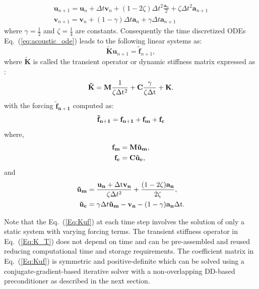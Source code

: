 \documentclass{article}
\begin{document}
\begin{align}
\mathbf{u}_{n+1} = \mathbf{u}_n + \Delta t \mathbf{v}_n + (1-2\zeta)  \Delta t^2 \frac{\mathbf{a}_n}{2} + \zeta \Delta t^2 \mathbf{a}_{n+1} \\
\mathbf{v}_{n+1} = \mathbf{v}_n + (1-\gamma)  \Delta t \mathbf{a}_n + \gamma \Delta t \mathbf{a}_{n+1}
\end{align}
where $\gamma = \frac{1}{2}$ and $\zeta = \frac{1}{4}$ are constants. Consequently the time discretized ODEs Eq.~(\ref{eq:acoustic_ode}) leads to the following linear systems as:
\begin{equation}\label{Eq:Kuf}
\mathbf{\tilde{K}} \mathbf{u}_{n+1} = \mathbf{\tilde{f}}_{n+1},
\end{equation} 
where $\mathbf{\tilde{K}}$ is called the transient operator or dynamic stiffness matrix expressed as \cite{farhat_nasa}:
\begin{equation}\label{Eq:K_T}
\mathbf{\tilde{K}} = \bf{M} \frac{\mathrm{1}}{\zeta \mathrm{\Delta t^2}} + \bf{C} \frac{\gamma}{\zeta \mathrm{\Delta t} } + \bf{K}.
\end{equation}
with the forcing $\mathbf{\tilde{f}_{n+1}}$ computed as:
\begin{equation}
\mathbf{\tilde{f}_{n+1}} = \bf{f}_{n+1} + \bf{f_m} + \bf{f_c}
\end{equation}
where,
\begin{align}\label{Eq:fparts}
    \bf{f_m} &= \bf{M}  \bf{\tilde{u}_m},  \\ \label{Eq:fparts2}
    \bf{f_c} &= \bf{C}   \bf{\tilde{u}_c}, 
\end{align}
and
\begin{align}\label{Eq:UmCm}
    \bf{\tilde{u}_m} &=  \frac{\bf{u_n} + \mathrm{\Delta t}  \bf{v_n} } {\zeta \Delta t^2}+\frac{(1-2\zeta)\bf{a_n}}{2\zeta}, \\ \label{Eq:UmCm2}
    \bf{\tilde{u}_c} &=  \gamma \Delta t  \bf{\tilde{u}_m}  - \bf{v_n} -  (\mathrm{1}-\gamma) \bf{a_n}  \mathrm{\Delta t}.
\end{align}

Note that the Eq.~(\ref{Eq:Kuf}) at each time step involves the solution of only a static system with varying forcing terms. The transient stiffness operator in Eq.~(\ref{Eq:K_T}) does not depend on time and can be pre-assembled and reused reducing computational time and storage requirements. The coefficient matrix in Eq.~(\ref{Eq:Kuf}) is symmetric and positive-definite which can be solved using a conjugate-gradient-based iterative solver with a non-overlapping DD-based preconditioner as described in the next section.
\end{document}
